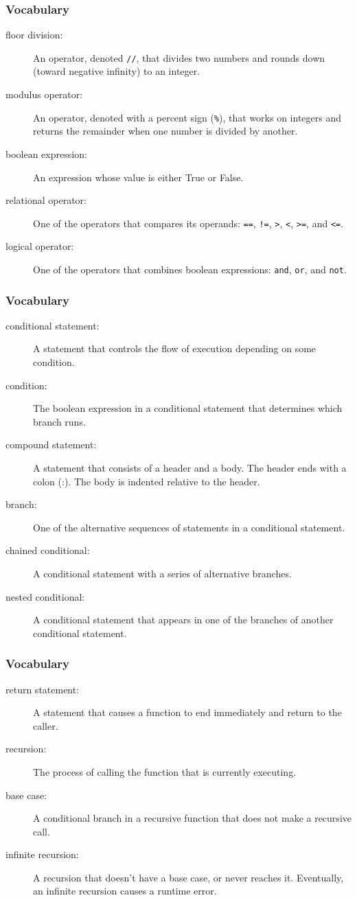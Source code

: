 \documentclass{beamer}
\newcommand{\bfr}[1]{\begin{frame}[fragile]\frametitle{{ #1 }}}
\begin{document}
\bfr{Vocabulary}
\begin{description}
\item[floor division:]
An operator, denoted \verb|//|, that divides two numbers and rounds down (toward negative infinity) to an integer.
\item[modulus operator:]
An operator, denoted with a percent sign (\verb|%|), that works on integers and returns the remainder when one number is divided by another.
\item[boolean expression:]
An expression whose value is either True or False.
\item[relational operator:]
One of the operators that compares its operands: 
\verb|==|, \verb|!=|, \verb|>|, \verb|<|, \verb|>=|, and \verb|<=|.
\item[logical operator:]
One of the operators that combines boolean expressions: 
\verb|and|, \verb|or|, and \verb|not|.
\end{description}
\end{frame}
\bfr{Vocabulary}
\begin{description}
\item[conditional statement:]
A statement that controls the flow of execution depending on some condition.
\item[condition:]
The boolean expression in a conditional statement that determines which branch runs.
\item[compound statement:]
A statement that consists of a header and a body. The header ends with a colon (:). The body is indented relative to the header.
\item[branch:]
One of the alternative sequences of statements in a conditional statement.
\item[chained conditional:]
A conditional statement with a series of alternative branches.
\item[nested conditional:]
A conditional statement that appears in one of the branches of another conditional statement.
\end{description}
\end{frame}
\bfr{Vocabulary}
\begin{description}
\item[return statement:]
A statement that causes a function to end immediately and return to the caller.
\item[recursion:]
The process of calling the function that is currently executing.
\item[base case:]
A conditional branch in a recursive function that does not make a recursive call.
\item[infinite recursion:]
A recursion that doesn’t have a base case, or never reaches it. Eventually, an infinite recursion causes a runtime error.
\end{description}
\end{frame}
\end{document}
